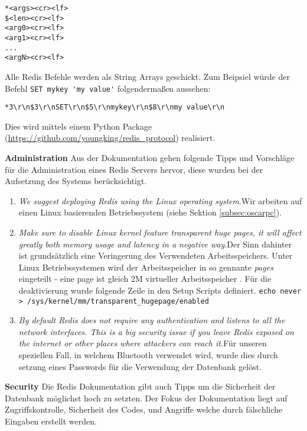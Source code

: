 \begin{lstlisting}[caption=RESP]
*<args><cr><lf>
$<len><cr><lf>
<arg0><cr><lf>
<arg1><cr><lf>
...
<argN><cr><lf>
\end{lstlisting}

Alle Redis Befehle werden als String Arrays geschickt. Zum Beipsiel würde der Befehl \lstinline{SET mykey 'my value'} folgendermaßen aussehen:

\tab\lstinline{*3\r\n$3\r\nSET\r\n$5\r\nmykey\r\n$8\r\nmy value\r\n}

Dies wird mittels einem Python Package (\url{https://github.com/youngking/redis_protocol}) realisiert.

\textbf{Administration\newline}
Aus der Dokumentation \cite{MELD.CH3-redis.mainWebsite} gehen folgende Tipps und Vorschläge für die Administration eines Redis Servers hervor, diese wurden bei der Aufsetzung des Systems berücksichtigt.

\begin{enumerate}
\item \textit{We suggest deploying Redis using the Linux operating system}.\nextline Wir arbeiten auf einen Linux basierenden Betriebssystem (siehe Sektion \ref{subsec:oscarpc}).
\item \textit{Make sure to disable Linux kernel feature transparent huge pages, it will affect greatly both memory usage and latency in a negative way}.\nextline Der Sinn dahinter ist grundsätzlich eine Veringerung des Verwendeten Arbeitsspeichers. Unter Linux Betriebssystemen wird der Arbeitsspeicher in so gennante \textit{pages} eingeteilt - eine page ist gleich 2M virtueller Arbeitsspeicher \cite{MELD.CH3-redis.transhuge}. Für die deaktivierung wurde folgende Zeile in den Setup Scripts definiert. \lstinline{echo never > /sys/kernel/mm/transparent_hugepage/enabled}
\item \textit{By default Redis does not require any authentication and listens to all the network interfaces. This is a big security issue if you leave Redis exposed on the internet or other places where attackers can reach it.}\nextline Für unseren speziellen Fall, in welchem Bluetooth verwendet wird, wurde dies durch setzung eines Passwords für die Verwendung der Datenbank gelöst.
\end{enumerate}

\textbf{Security\newline}
Die Redis Dokumentation \cite{MELD.CH3-redis.documentation} gibt auch Tipps um die Sicherheit der Datenbank möglichst hoch zu setzten. Der Fokus der Dokumentation liegt auf Zugriffskontrolle, Sicherheit des Codes, und Angriffe welche durch fälschliche Eingaben erstellt werden.

